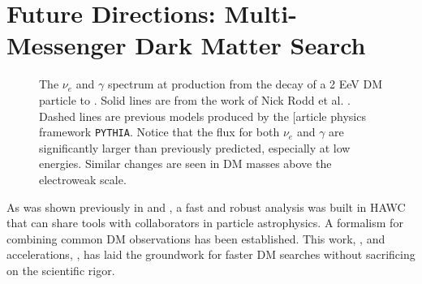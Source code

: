 \section{Future Directions: Multi-Messenger Dark Matter Search}\label{sec:future}

\begin{figure}[h]
    \caption{The $\nu_e$ and $\gamma$ spectrum at production from the decay of a 2 EeV DM particle to . Solid lines are from the work of Nick Rodd et al. \cite{Rodd:HDM_spec}. Dashed lines are previous models produced by the [article physics framework \texttt{PYTHIA}. Notice that the flux for both $\nu_e$ and $\gamma$ are significantly larger than previously predicted, especially at low energies. Similar changes are seen in DM masses above the electroweak scale.}
    \label{fig:nu_and_gam}
\end{figure}

As was shown previously in  and , a fast and robust analysis was built in HAWC that can share tools with collaborators in particle astrophysics.
A formalism for combining common DM observations has been established.
This work, , and accelerations, , has laid the groundwork for faster DM searches without sacrificing on the scientific rigor.

